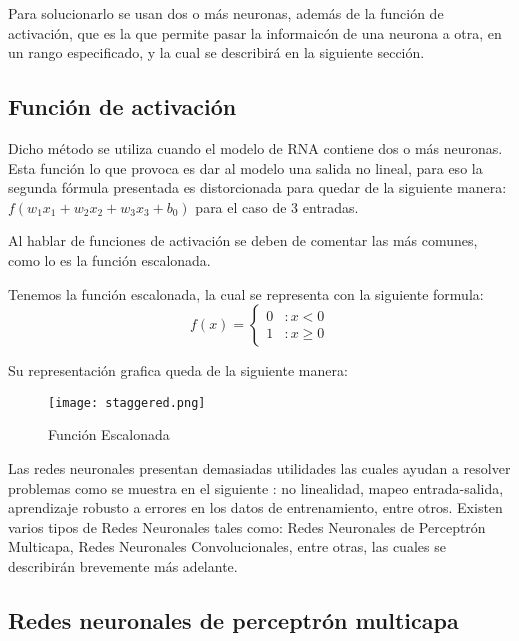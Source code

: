     Para solucionarlo se usan dos o más neuronas, además de la función de activación, que es la que permite pasar la informaicón de una neurona a otra, en un rango especificado, y la cual se describirá en la siguiente sección.

    \subsection{Función de activación} \label{sec: activation}

      Dicho método se utiliza cuando el modelo de RNA contiene dos o más neuronas.
      Esta función lo que provoca es dar al modelo una salida no lineal, para eso la segunda fórmula presentada es distorcionada para quedar de la siguiente manera: $f( w_1x_1 + w_2x_2 + w_3x_3 + b_0)$ para el caso de 3 entradas.
      
      Al hablar de funciones de activación se deben de comentar las más comunes, como lo es la función escalonada.

      Tenemos la función escalonada, la cual se representa con la siguiente formula: 
      \[f(x) = \left\{ \begin{array}{lr} 0 & : x < 0\\ 1 & : x \ge 0 \end{array} \right. \]

      Su representación grafica queda de la siguiente manera:
      \begin{figure}[H]
        \centering
        \texttt{[image: staggered.png]}
        \caption{Función Escalonada}
        \label{fig:Función Escalonada}
      \end{figure}

      Las redes neuronales presentan demasiadas utilidades las cuales ayudan a resolver problemas como se muestra en el siguiente \cite{liu2015}: no linealidad, mapeo entrada-salida, aprendizaje robusto a errores en los datos de entrenamiento, entre otros.  Existen varios tipos de Redes Neuronales tales como: Redes Neuronales de Perceptr\'on Multicapa, Redes Neuronales Convolucionales, entre otras, las cuales se describirán brevemente más adelante.
      
      \subsection{Redes neuronales de perceptr\'on multicapa}

